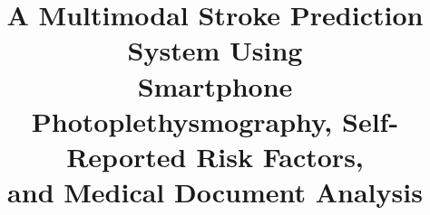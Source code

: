 \documentclass[conference]{IEEEtran}
\begin{document}
\title{A Multimodal Stroke Prediction System Using\\
Smartphone Photoplethysmography, Self-Reported Risk Factors,\\
and Medical Document Analysis}

\author{
\IEEEauthorblockN{
    \rule{3cm}{0.4pt}\quad
    \rule{3cm}{0.4pt}\quad
    \rule{3cm}{0.4pt}
}
\IEEEauthorblockA{
    \textit{\rule{4cm}{0.4pt}} \\
    \textit{\rule{5cm}{0.4pt}} \\
    \rule{4cm}{0.4pt} \\
    \rule{5cm}{0.4pt}
}
\vspace{6mm}
}

\maketitle
\end{document}
